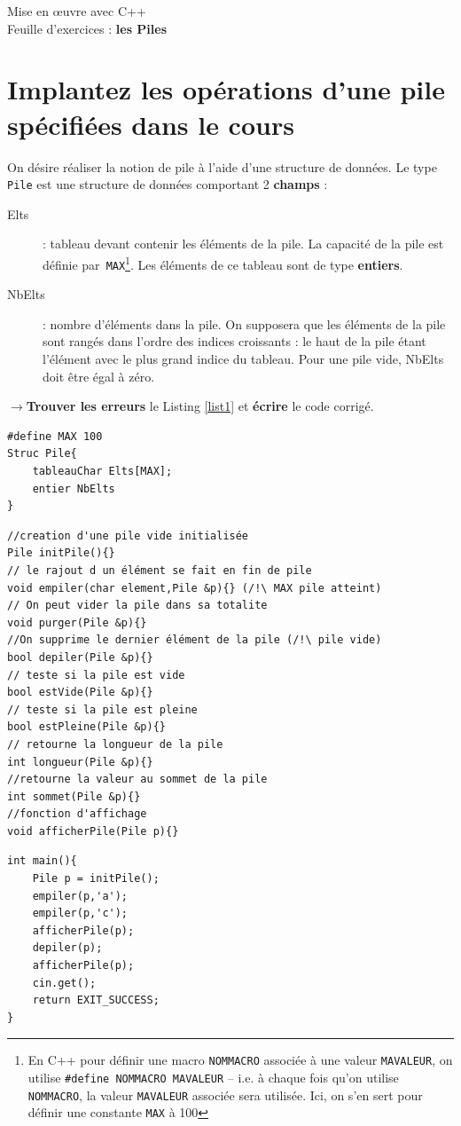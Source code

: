 \documentclass[french]{article}
\begin{document}
	
	\begin{minipage}{\textwidth}
		\begin{center}
			
			{\Large Mise en œuvre avec C++ \\ Feuille d'exercices : \textbf{les Piles}}
		\end{center}
	\end{minipage}
	\section{Implantez les opérations d’une pile spécifiées dans le cours}
On désire réaliser la notion de pile à l'aide d'une structure de données. 
Le type \texttt{Pile} est une structure de données comportant 2 \textbf{champs} :
\begin{description}
	\item[Elts] : tableau devant contenir les éléments de la pile. La capacité de la pile est définie par~\texttt{MAX}\footnote{En C++ pour définir une macro \texttt{NOMMACRO} associée à une valeur \texttt{MAVALEUR}, on utilise \texttt{\#define NOMMACRO MAVALEUR} -- i.e. à chaque fois qu'on utilise \texttt{NOMMACRO}, la valeur \texttt{MAVALEUR} associée sera utilisée. Ici, on s'en sert pour définir une constante \texttt{MAX} à 100}. Les éléments de ce tableau sont de type \textbf{entiers}.
	\item[NbElts] : nombre d’éléments dans la pile. On supposera que les éléments de la pile sont rangés dans l’ordre des indices croissants : le haut de la pile étant l'élément avec le plus grand indice du tableau. Pour une pile vide, NbElts doit être égal à zéro.
\end{description}

$\rightarrow$\textbf{Trouver les erreurs} le Listing \ref{list1} et \textbf{écrire} le code corrigé.
	\begin{lstlisting}[caption={A corriger: Structure Pile},label=list1]
#define MAX 100
Struc Pile{
	tableauChar Elts[MAX];
	entier NbElts
} 
\end{lstlisting}

	\begin{lstlisting}[caption={Squelette de Pile},label=list2]
//creation d'une pile vide initialisée
Pile initPile(){}
// le rajout d un élément se fait en fin de pile
void empiler(char element,Pile &p){} (/!\ MAX pile atteint)
// On peut vider la pile dans sa totalite
void purger(Pile &p){} 
//On supprime le dernier élément de la pile (/!\ pile vide)
bool depiler(Pile &p){}
// teste si la pile est vide
bool estVide(Pile &p){} 
// teste si la pile est pleine
bool estPleine(Pile &p){}
// retourne la longueur de la pile
int longueur(Pile &p){}
//retourne la valeur au sommet de la pile
int sommet(Pile &p){}
//fonction d'affichage
void afficherPile(Pile p){}
\end{lstlisting}
\begin{lstlisting}[caption={main a executer},label=list3]
int main(){
	Pile p = initPile();
	empiler(p,'a');
	empiler(p,'c');
	afficherPile(p);
	depiler(p);
	afficherPile(p);
	cin.get();
	return EXIT_SUCCESS;
}
\end{lstlisting}
\end{document}
